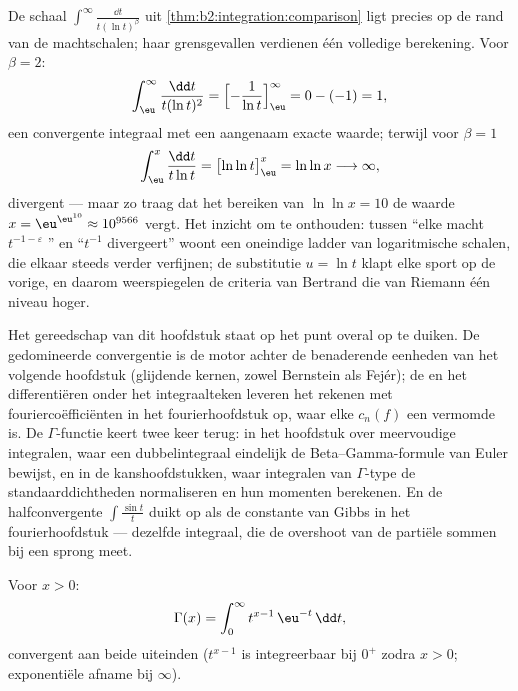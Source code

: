 \begin{example}\label{ex:b2:integration:bertrandboundary}
De schaal $\int^\infty\frac{\dd t}{t(\ln t)^\beta}$ uit
\cref{thm:b2:integration:comparison} ligt precies op de rand van de
machtschalen; haar grensgevallen verdienen één volledige
berekening. Voor $\beta = 2$:
\[
\int_\eu^{\infty}\frac{\dd t}{t(\ln t)^2}
= \Bigl[-\frac{1}{\ln t}\Bigr]_\eu^{\infty}
= 0 - (-1) = 1 ,
\]
een convergente integraal met een aangenaam exacte waarde; terwijl
voor $\beta = 1$
\[
\int_\eu^{x}\frac{\dd t}{t\ln t}
= \bigl[\ln\ln t\bigr]_\eu^{x} = \ln\ln x
\longrightarrow \infty ,
\]
divergent --- maar zo traag dat het bereiken van $\ln\ln x = 10$ de
waarde $x = \eu^{\eu^{10}} \approx 10^{9566}$ vergt. Het inzicht om
te onthouden: tussen ``elke macht $t^{-1-\varepsilon}$
'' en ``$t^{-1}$ divergeert'' woont een oneindige ladder
van logaritmische schalen, die elkaar steeds verder verfijnen; de
substitutie $u = \ln t$ klapt elke sport op de vorige, en daarom
weerspiegelen de criteria van Bertrand die van Riemann één niveau
hoger.
\end{example}

\begin{remark}
Het gereedschap van dit hoofdstuk staat op het punt overal op te
duiken. De gedomineerde convergentie is de motor achter de
benaderende eenheden van het volgende hoofdstuk (glijdende kernen,
zowel Bernstein als Fejér); de  en het differentiëren
onder het integraalteken leveren het rekenen met
fouriercoëfficiënten in het fourierhoofdstuk op, waar elke $c_n(f)$
een vermomde  is. De $\Gamma$-functie keert twee
keer terug: in het hoofdstuk over meervoudige integralen, waar een
dubbelintegraal eindelijk de Beta--Gamma-formule van Euler 
bewijst, en in de kanshoofdstukken, waar integralen van
$\Gamma$-type de standaarddichtheden normaliseren en hun momenten
berekenen. En de halfconvergente $\int\frac{\sin t}{t}$ duikt op
als de constante van Gibbs in het fourierhoofdstuk --- dezelfde
integraal, die de overshoot van de partiële sommen bij een sprong
meet.
\end{remark}

\begin{definition}\label{def:b2:integration:gamma}
Voor $x > 0$:
\[
\Gamma(x) = \int_0^{\infty} t^{x-1}\,\eu^{-t}\,\dd t ,
\]
convergent aan beide uiteinden ($t^{x-1}$ is integreerbaar bij
$0^+$ zodra $x > 0$; exponentiële afname bij $\infty$).
\end{definition}

